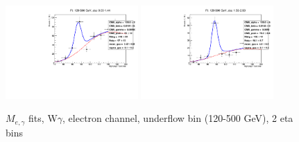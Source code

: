 \begin{figure}[htb]
  \begin{center}
   \includegraphics[width=0.45\textwidth]{../figs/figs_v11/ELECTRON_WGamma/EtoGammaFits/sa_hZmass_h_Data_EtoGamma_Enr_BARREL_pt120to500_ieta0_noWMtCut.pdf}
   \includegraphics[width=0.45\textwidth]{../figs/figs_v11/ELECTRON_WGamma/EtoGammaFits/sa_hZmass_h_Data_EtoGamma_Enr_ENDCAP_pt120to500_ieta0_noWMtCut.pdf}\\
  \label{fig:etogFits_120to500}
  \caption{$M_{e,\gamma}$ fits, W$\gamma$, electron channel, underflow bin (120-500 GeV), 2 eta bins}
  \end{center}
\end{figure}


